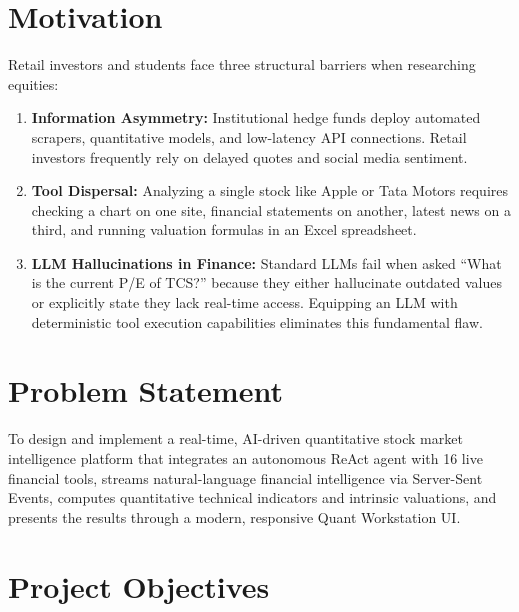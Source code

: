 \documentclass[12pt,a4paper]{report}
\begin{document}
\section{Motivation}

Retail investors and students face three structural barriers when researching equities:
\begin{enumerate}[leftmargin=*,label=\textbf{\arabic*.}]
  \item \textbf{Information Asymmetry:} Institutional hedge funds deploy automated scrapers, quantitative models, and low-latency API connections. Retail investors frequently rely on delayed quotes and social media sentiment.
  \item \textbf{Tool Dispersal:} Analyzing a single stock like Apple or Tata Motors requires checking a chart on one site, financial statements on another, latest news on a third, and running valuation formulas in an Excel spreadsheet.
  \item \textbf{LLM Hallucinations in Finance:} Standard LLMs fail when asked ``What is the current P/E of TCS?'' because they either hallucinate outdated values or explicitly state they lack real-time access. Equipping an LLM with deterministic tool execution capabilities eliminates this fundamental flaw.
\end{enumerate}

\section{Problem Statement}

To design and implement a real-time, AI-driven quantitative stock market intelligence platform that integrates an autonomous ReAct agent with 16 live financial tools, streams natural-language financial intelligence via Server-Sent Events, computes quantitative technical indicators and intrinsic valuations, and presents the results through a modern, responsive Quant Workstation UI.

\section{Project Objectives}
\end{document}
